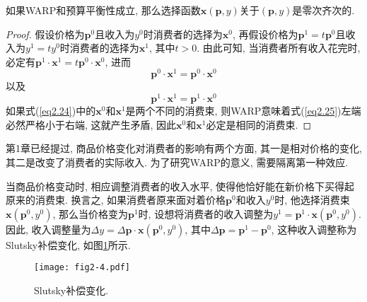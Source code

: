 \documentclass[cn, 12pt, math=mtpro2, bibstyle=apa, blue, twocol]{elegantbook}
\newcommand{\p}{\mathbf{p}}
\newcommand{\x}{\mathbf{x}}
\begin{document}
\begin{theorem}
如果WARP和预算平衡性成立, 那么选择函数$\x(\p,y)$关于$(\p,y)$是零次齐次的.
\end{theorem}
\begin{proof}
  假设价格为$\p^0$且收入为$y^0$时消费者的选择为$\x^0$, 再假设价格为$\p^1=t\p^0$且收入为$y^1=ty^0$时消费者的选择为$\x^1$, 其中$t>0$. 由此可知, 当消费者所有收入花完时, 必定有$\p^1\cdot\x^1=t\p^0\cdot\x^0$, 进而
  \begin{equation}\label{eq2.24}
    \p^0\cdot\x^1=\p^0\cdot\x^0
  \end{equation}
  以及
  \begin{equation}\label{eq2.25}
    \p^1\cdot\x^1=\p^1\cdot\x^0
  \end{equation}
  如果式(\ref{eq2.24})中的$\x^0$和$\x^1$是两个不同的消费束, 则WARP意味着式(\ref{eq2.25})左端必然严格小于右端, 这就产生矛盾, 因此$\x^0$和$\x^1$必定是相同的消费束.
\end{proof}

第1章已经提过, 商品价格变化对消费者的影响有两个方面, 其一是相对价格的变化, 其二是改变了消费者的实际收入. 为了研究WARP的意义, 需要隔离第一种效应. 

当商品价格变动时, 相应调整消费者的收入水平, 使得他恰好能在新价格下买得起原来的消费束. 换言之, 如果消费者原来面对着价格$\p^0$和收入$y^0$时, 他选择消费束$\x(\p^0,y^0)$, 那么当价格变为$\p^1$时, 设想将消费者的收入调整为$y^1=\p^1\cdot\x(\p^0,y^0)$. 因此, 收入调整量为$\Delta y=\Delta \p\cdot\x(\p^0,y^0)$, 其中$\Delta \p=\p^1-\p^0$, 这种收入调整称为Slutsky补偿变化, 如图\ref{fig2.4}所示.

\begin{figure}[htbp!]
  \centering
  \texttt{[image: fig2-4.pdf]}
  \caption{Slutsky补偿变化.}\label{fig2.4}
\end{figure}
\end{document}
